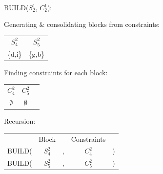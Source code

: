 \documentclass[11pt]{article} %
\begin{document}
	\hspace{0.5cm}BUILD($S_2^1$, $C_2^1$):
		\begin{center}
		Generating \& consolidating blocks from constraints:
		
		\begin{tabular}{c c}
			\hspace{0.8cm}$S_4^2$\hspace{0.8cm} & \hspace{0.8cm}$S_5^2$\hspace{0.8cm} \\
			\{d,i\} & \{g,b\}
		\end{tabular}
	
		Finding constraints for each block:
		
		\begin{tabular}{c c c}
			\hspace{0.8cm}$C_4^2$\hspace{0.8cm} & \hspace{0.8cm}$C_5^2$\hspace{0.8cm} \\
			$\emptyset$ & $\emptyset$
		\end{tabular}

		Recursion:
		
		\begin{tabular}{c c c c c}
			 & Block & & Constraints & \\
			BUILD( & $S_4^2$ & , & $C_4^2$ & ) \\
			BUILD( & $S_5^2$ & , & $C_5^2$ & )
		\end{tabular}
		\end{center}
\end{document}
